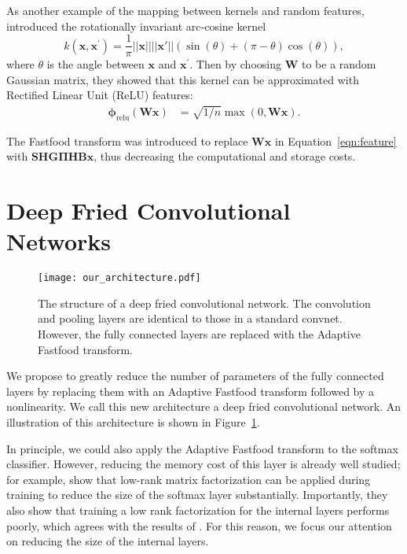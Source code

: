 \documentclass[10pt,twocolumn,letterpaper]{article}
\newcommand{\myvec}[1]{\mathbf{#1}}
\newcommand{\myvecsym}[1]{\boldsymbol{#1}}
\newcommand{\vphi}{\myvecsym{\phi}}
\newcommand{\vPi}{\myvecsym{\Pi}}
\newcommand{\vx}{\myvec{x}}
\newcommand{\vB}{\myvec{B}}
\newcommand{\vG}{\myvec{G}}
\newcommand{\vH}{\myvec{H}}
\newcommand{\vS}{\myvec{S}}
\newcommand{\vW}{\myvec{W}}
\newcommand{\be}{\begin{equation}}
\newcommand{\ee}{\end{equation}}
\begin{document}
As another example of the mapping between kernels and random features, 
\cite{ChoS09,PandeyD14} introduced the rotationally invariant arc-cosine kernel
\be
  k(\vx, \vx^{\prime}) = \frac{1}{\pi}||\vx|| ||\vx'||
  (\sin(\theta) + (\pi - \theta) \cos(\theta)),
\ee
where $\theta$ is the angle between $\vx$ and $\vx^{\prime}$. Then by choosing $\vW$ to be a random Gaussian matrix, they showed that this kernel can be approximated with Rectified Linear Unit (ReLU) features:
\begin{align}
  \vphi_{\mathrm{relu}}(\vW \vx) & = \sqrt{1/n}\max(0, \vW \vx)
  \label{eq:relu-feature}.
\end{align}

The Fastfood transform was introduced to replace $\vW\vx$ in Equation~\ref{eqn:feature} with  $\vS\vH\vG\vPi \vH\vB\vx$, thus decreasing the computational and storage costs. 

\section{Deep Fried Convolutional Networks}
\label{sec:deepfried}

\begin{figure}[tbh]
  \texttt{[image: our\_architecture.pdf]}
  \centering
  \caption{The structure of a deep fried convolutional network.  The convolution and pooling layers are identical to those in a
    standard convnet. However, the fully connected layers are
    replaced with the Adaptive Fastfood transform.}
  \label{fig:ffconvnet}
\end{figure}



We propose to greatly reduce the number of parameters of the fully connected layers by replacing
them with an Adaptive Fastfood transform followed by a nonlinearity. We call this new
architecture a deep fried convolutional network. An
illustration of this architecture is shown in 
Figure~\ref{fig:ffconvnet}.

In principle, we could also apply the Adaptive Fastfood transform to the softmax classifier. However, reducing the memory cost of this layer is already well studied; for example, \cite{SainathKSAR13} show that low-rank matrix factorization can be applied during training to reduce the size of the softmax layer substantially. Importantly, they also show that training a low rank factorization for the internal layers performs poorly, which agrees with the results of \cite{DenilSDRF13}.  For this reason, we focus our attention on reducing the size of the internal layers.
\end{document}
